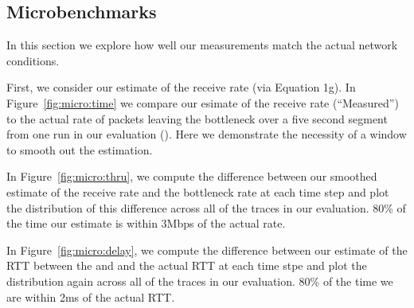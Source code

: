 \subsection{Microbenchmarks}
\label{s:measure:microbench}
    
    
    
    In this section we explore how well our measurements match the actual network conditions. 

    First, we consider our estimate of the receive rate (via Equation 1g). In Figure~\ref{fig:micro:time}
    we compare our esimate of the receive rate (``Measured'') to the actual rate of packets 
    leaving the bottleneck over a five second segment from one run in our evaluation ().
    Here we demonstrate the necessity of a window to smooth out the estimation.

    In Figure~\ref{fig:micro:thru}, we compute the difference between our smoothed estimate of the receive rate 
    and the bottleneck rate at each time step and plot the distribution of this difference across
    all of the traces in our evaluation. 80\% of the time our estimate is within 3Mbps of the 
    actual rate.

    In Figure~\ref{fig:micro:delay}, we compute the difference between our estimate of the RTT between
    the \inbox and \outbox and the actual RTT at each time stpe and plot the distribution again
    across all of the traces in our evaluation. 80\% of the time we are within 2ms of the actual RTT.
    

